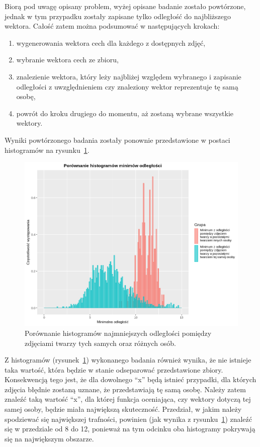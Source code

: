\pagebreak

Biorą pod uwagę opisany problem, wyżej opisane badanie zostało powtórzone, jednak w tym przypadku
zostały zapisane tylko odległość do najbliższego wektora.
Całość zatem można podsumować w następujących krokach:
\begin{enumerate}
    \item wygenerowania wektora cech dla każdego z dostępnych zdjęć,
    \item wybranie wektora cech ze zbioru,
    \item znalezienie wektora, który leży najbliżej względem wybranego i zapisanie odległości
    z uwzględnieniem czy znaleziony wektor reprezentuje tę samą osobę,
    \item powrót do kroku drugiego do momentu, aż zostaną wybrane wszystkie wektory.
\end{enumerate}
Wyniki powtórzonego badania zostały ponownie przedstawione w postaci
histogramów na rysunku~\ref{fig:wykres_najmniejszych_odleglosc_wspolny}.

\begin{figure}[H]
    \centering
    \includegraphics[width=1\textwidth]{images/wykres_najmniejszych_odleglosc_wspolny}
    \caption{
        Porównanie histogramów najmniejszych odległości pomiędzy
        zdjęciami twarzy tych samych oraz różnych osób.
    }
    \customsource
    \label{fig:wykres_najmniejszych_odleglosc_wspolny}
\end{figure}

\pagebreak

Z histogramów (rysunek~\ref{fig:wykres_najmniejszych_odleglosc_wspolny}) wykonanego badania również wynika,
że nie istnieje taka wartość, która będzie w stanie odseparować przedstawione zbiory.
Konsekwencją tego jest, że dla dowolnego ``x'' będą istnieć przypadki, dla których
zdjęcia błędnie zostaną uznane, że przedstawiają tę samą osobę.
Należy zatem znaleźć taką wartość ``x'', dla której funkcja oceniająca, czy wektory
dotyczą tej samej osoby, będzie miała największą skuteczność.
Przedział, w jakim należy spodziewać się największej trafności,
powinien (jak wynika z rysunku~\ref{fig:wykres_najmniejszych_odleglosc_wspolny})
znaleźć się w przedziale od \num{8} do \num{12}, ponieważ na tym odcinku
oba histogramy pokrywają się na największym obszarze.

